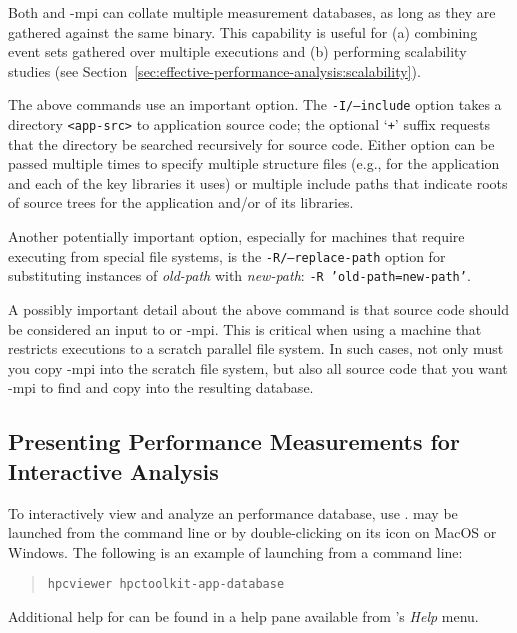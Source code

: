 \documentclass[11pt,twoside,letterpaper]{report}
\begin{document}
Both \hpcprof{} and \hpcprof-mpi{} can collate multiple measurement databases, as long as they are gathered against the same binary.
This capability is useful for (a) combining event sets gathered over multiple executions
and (b) performing scalability studies (see Section~\ref{sec:effective-performance-analysis:scalability}).

The above commands use an important option.
The \texttt{-I/--include} option takes a directory \texttt{<app-src>} to application source code;
the optional `\texttt{+}' suffix requests that the directory be searched recursively for source code.
Either option can be passed multiple times to specify multiple structure files (e.g., for the application
and each of the key libraries it uses) or multiple include paths that indicate
roots of source trees for the application and/or of its libraries.

Another potentially important option, especially for machines that require executing from special file systems, is the \texttt{-R/--replace-path} option for substituting instances of \emph{old-path} with \emph{new-path}: \texttt{-R 'old-path=new-path'}.

A possibly important detail about the above command is that source code should be considered
an input to  \hpcprof{} or \hpcprof-mpi{}.
This is critical when using a machine that restricts executions to a scratch parallel file system.
In such cases,
not only must you copy \hpcprof-mpi{} into the scratch file system,
but also all source code that you want \hpcprof-mpi{} to find and copy into the resulting database.



\subsection{Presenting Performance Measurements for Interactive Analysis}

To interactively view and analyze an \HPCToolkit{} performance database, use \hpcviewer{}.
\hpcviewer{} may be launched from the command line or by double-clicking on its icon on MacOS or Windows.
The following is an example of launching from a command line:
\begin{quote}
  \verb|hpcviewer hpctoolkit-app-database|
\end{quote}
Additional help for \hpcviewer{} can be found in a help pane available from \hpcviewer{}'s \emph{Help} menu.
\end{document}

